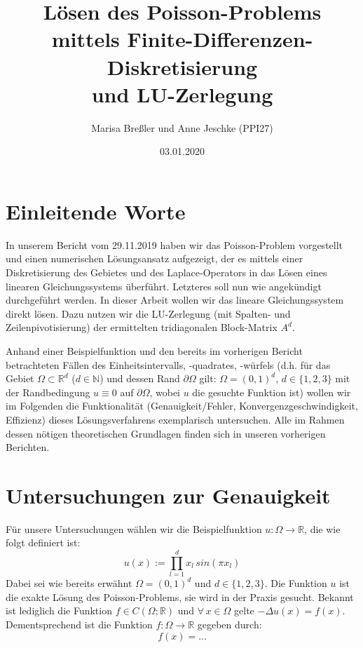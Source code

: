 \documentclass{scrartcl}
\newcommand{\R}{\mathbb{R}}
\begin{document}
\title{Lösen des Poisson-Problems mittels Finite-Differenzen-Diskretisierung\\
und LU-Zerlegung}
\author{Marisa Breßler und Anne Jeschke (PPI27)}
\date{03.01.2020}
\maketitle

\tableofcontents

\pagebreak
\section{Einleitende Worte}
In unserem Bericht  vom 29.11.2019 haben wir das Poisson-Problem vorgestellt und einen numerischen Lösungsansatz aufgezeigt, der es mittels einer Diskretisierung des Gebietes und des Laplace-Operators in das Lösen eines linearen Gleichungssystems überführt.
Letzteres soll nun wie angekündigt durchgeführt werden.
In dieser Arbeit wollen wir das lineare Gleichungssystem direkt lösen.
Dazu nutzen wir die LU-Zerlegung (mit Spalten- und Zeilenpivotisierung) der ermittelten tridiagonalen Block-Matrix $A^d$.

Anhand einer Beispielfunktion und den bereits im vorherigen Bericht betrachteten Fällen des Einheitsintervalls, -quadrates, -würfels (d.h. für das Gebiet $\Omega\subset\R^d$ ($d\in\mathbb{N}$) und dessen Rand $\partial\Omega$ gilt:
$\Omega=(0,1)^d$, $d\in\{1, 2, 3\}$ mit der Randbedingung $u \equiv 0$ auf $\partial\Omega$, wobei $u$ die gesuchte Funktion ist)
wollen wir im Folgenden die Funktionalität (Genauigkeit/Fehler, Konvergenzgeschwindigkeit, Effizienz) dieses Lösungsverfahrens exemplarisch untersuchen.
Alle im Rahmen dessen nötigen theoretischen Grundlagen finden sich in unseren vorherigen Berichten.

\pagebreak
\section{Untersuchungen zur Genauigkeit}
Für unsere Untersuchungen wählen wir die Beispielfunktion $u: \Omega \rightarrow \mathbb{R}$, die wie folgt definiert ist:
\[u(x) := \prod \limits_{l=1}^{d} x_l \, sin(\pi x_l)\]
Dabei sei wie bereits erwähnt $\Omega = (0,1)^d$ und $d\in\{1, 2, 3\}$.
Die Funktion $u$ ist die exakte Lösung des Poisson-Problems, sie wird in der Praxis gesucht. Bekannt ist lediglich die Funktion $f\in C(\Omega ; \R)$ und $\forall \, x \in\Omega$ gelte $-\Delta u(x) = f(x)$. Dementsprechend ist die Funktion $f: \Omega \rightarrow \mathbb{R}$ gegeben durch:
\[f(x) = ... \]
\end{document}
